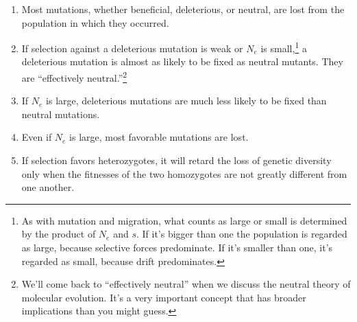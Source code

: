 \documentclass[12pt]{article}
\begin{document}
\begin{enumerate}

\item Most mutations, whether beneficial, deleterious, or neutral, are
  lost from the population in which they occurred.

\item If selection against a deleterious mutation is weak or $N_e$ is
  small,\footnote{As with mutation and migration, what counts as large
    or small is determined by the product of $N_e$ and $s$. If it's
    bigger than one the population is regarded as large, because
    selective forces predominate. If it's smaller than one, it's
    regarded as small, because drift predominates.} a deleterious
  mutation is almost as likely to be fixed as neutral mutants. They
  are ``effectively neutral.''\footnote{We'll
    come back to ``effectively neutral'' when we discuss the neutral
    theory of molecular evolution. It's a very important concept that
    has broader implications than you might guess.}

\item If $N_e$ is large, deleterious mutations are much less likely to
  be fixed than neutral mutations.

\item Even if $N_e$ is large, most favorable mutations are lost.

\item If selection favors heterozygotes, it will retard the loss of
  genetic diversity only when the fitnesses of the two homozygotes are
  not greatly different from one another.

\end{enumerate}




\ccLicense
\end{document}

